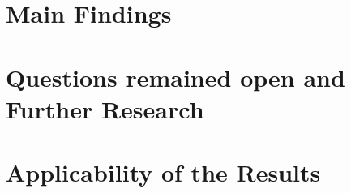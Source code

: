 \Conclusion

\section{Main Findings}

\section{Questions remained open and Further Research}

\section{Applicability of the Results}